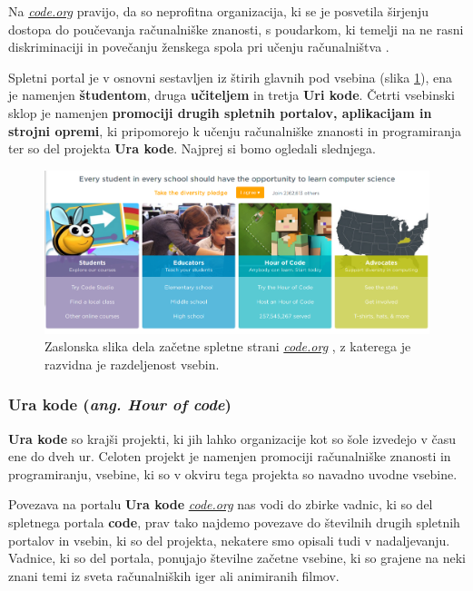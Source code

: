 Na \emph{\href{https://code.org}{code.org}} \cite{web:code.org}
pravijo, da so neprofitna organizacija, ki se je posvetila širjenju
dostopa do poučevanja računalniške znanosti, s poudarkom, ki temelji
na ne rasni diskriminaciji in povečanju ženskega spola pri učenju
računalništva \cite{web:code.org:about}.

Spletni portal je v osnovni sestavljen iz štirih glavnih pod vsebina
(slika \ref{fig:scr:web:code:main}), ena je namenjen
\textbf{študentom}, druga \textbf{učiteljem} in tretja \textbf{Uri
  kode}. Četrti vsebinski sklop je namenjen \textbf{promociji drugih
  spletnih portalov, aplikacijam in strojni opremi}, ki pripomorejo k
učenju računalniške znanosti in programiranja ter so del projekta
\textbf{Ura kode}. Najprej si bomo ogledali slednjega.

\begin{figure}[h!]
    \includegraphics [width=1\linewidth, keepaspectratio =
    1] {./images/sc_web/code_main_part-v01.png}
    \caption{Zaslonska slika dela začetne spletne strani
      \emph{\href{https://www.code.org}{code.org}}
      \cite{web:code.org}, z katerega je razvidna je razdeljenost
      vsebin.}
    \label{fig:scr:web:code:main}
\end{figure}

\subsubsection{Ura kode (\emph{ang. Hour of code})}
\label{sec:ura-kode-ang}

\textbf{Ura kode} so krajši projekti, ki jih lahko organizacije kot so
šole izvedejo v času ene do dveh ur. Celoten projekt je namenjen
promociji računalniške znanosti in programiranju, vsebine, ki so v
okviru tega projekta so navadno uvodne vsebine.

Povezava na portalu \textbf{Ura kode}
\emph{\href{https://code.org}{code.org}} nas vodi do zbirke vadnic, ki
so del spletnega portala \textbf{code}, prav tako najdemo povezave do
številnih drugih spletnih portalov in vsebin, ki so del projekta,
nekatere smo opisali tudi v nadaljevanju.  Vadnice, ki so del portala,
ponujajo številne začetne vsebine, ki so grajene na neki znani temi iz
sveta računalniških iger ali animiranih filmov.

